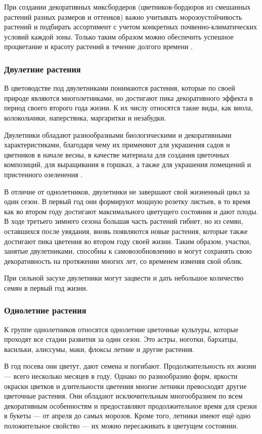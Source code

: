 При создании декоративных миксбордеров (цветников-бордюров из смешанных растений разных размеров и оттенков) важно учитывать морозоустойчивость растений и подбирать ассортимент с учетом конкретных почвенно-климатических условий каждой зоны. Только таким образом можно обеспечить успешное процветание и красоту растений в течение долгого времени \cite{karpisonova}.

\subsubsection{Двулетние растения}

В цветоводстве под двулетниками понимаются растения, которые по своей природе являются многолетниками, но достигают пика декоративного эффекта в период своего второго года жизни. К их числу относятся такие виды, как виола, колокольчики, наперстянка, маргаритки и незабудки.

Двулетники обладают разнообразными биологическими и декоративными характеристиками, благодаря чему их применяют для украшения садов и цветников в начале весны, в качестве материала для создания цветочных композиций, для выращивания в горшках, а также для украшения помещений и пристенного озеленения \cite{aldohinaFlower}.

В отличие от однолетников, двулетники не завершают свой жизненный цикл за один сезон. В первый год они формируют мощную розетку листьев, в то время как во втором году достигают максимального цветущего состояния и дают плоды. В ходе третьего зимнего сезона большая часть растений гибнет, но из семян, оставшихся после увядания, вновь появляются новые растения, которые также достигают пика цветения во втором году своей жизни. Таким образом, участки, занятые двулетниками, способны к самовозобновлению и могут сохранять свою декоративность на протяжении многих лет, со временем изменяя свой облик.

При сильной засухе двулетники могут зацвести и дать небольшое количество семян в первый год жизни.

\subsubsection{Однолетние растения}

К группе однолетников относятся однолетние цветочные культуры, которые проходят все стадии развития за один сезон. Это астры, ноготки, бархатцы, васильки, алиссумы, маки, флоксы летние и другие растения.

В год посева они цветут, дают семена и погибают. Продолжительность их жизни — всего несколько месяцев в году. Однако по разнообразию форм, яркости окраски цветков и длительности цветения многие летники превосходят другие цветочные растения. Они обладают исключительным многообразием по всем декоративным особенностям и предоставляют продолжительное время  для срезки в букеты — от апреля до самых морозов. Кроме того, летники имеют ещё одно положительное свойство — их можно пересаживать в цветущем состоянии.

